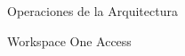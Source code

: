 \begin{subsection}{Operaciones de la Arquitectura}
\begin{subsubsection}{Workspace One Access}



\end{subsubsection}
\end{subsection}
